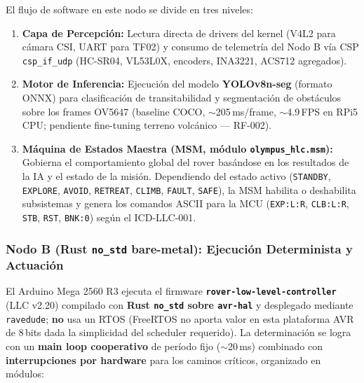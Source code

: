 El flujo de software en este nodo se divide en tres niveles:
\begin{enumerate}
    \item \textbf{Capa de Percepción:} Lectura directa de drivers del kernel (V4L2 para cámara CSI, UART para TF02) y consumo de telemetría del Nodo B vía CSP \texttt{csp\_if\_udp} (HC-SR04, VL53L0X, encoders, INA3221, ACS712 agregados).
    \item \textbf{Motor de Inferencia:} Ejecución del modelo \textbf{YOLOv8n-seg} (formato ONNX) para clasificación de transitabilidad y segmentación de obstáculos sobre los frames OV5647 (baseline COCO, $\sim$205\,ms/frame, $\sim$4.9\,FPS en RPi5 CPU; pendiente fine-tuning terreno volcánico --- RF-002).
    \item \textbf{Máquina de Estados Maestra (MSM, módulo \texttt{olympus\_hlc.msm}):} Gobierna el comportamiento global del rover basándose en los resultados de la IA y el estado de la misión. Dependiendo del estado activo (\texttt{STANDBY}, \texttt{EXPLORE}, \texttt{AVOID}, \texttt{RETREAT}, \texttt{CLIMB}, \texttt{FAULT}, \texttt{SAFE}), la MSM habilita o deshabilita subsistemas y genera los comandos ASCII para la MCU (\texttt{EXP:L:R}, \texttt{CLB:L:R}, \texttt{STB}, \texttt{RST}, \texttt{BNK:0}) según el ICD-LLC-001.
\end{enumerate}

\subsubsection{Nodo B (Rust \texttt{no\_std} bare-metal): Ejecución Determinista y Actuación}
\label{subsubsec:nodoB_freertos}
El Arduino Mega 2560 R3 ejecuta el firmware \textbf{\texttt{rover-low-level-controller}} (LLC v2.20) compilado con \textbf{Rust \texttt{no\_std} sobre \texttt{avr-hal}} y desplegado mediante \texttt{ravedude}; \textbf{no} usa un RTOS (FreeRTOS no aporta valor en esta plataforma AVR de 8\,bits dada la simplicidad del scheduler requerido). La determinación se logra con un \textbf{main loop cooperativo} de período fijo ($\sim$20\,ms) combinado con \textbf{interrupciones por hardware} para los caminos críticos, organizado en módulos:

